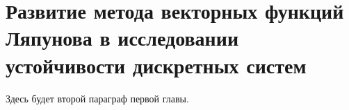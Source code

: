\section{Развитие метода векторных функций Ляпунова в исследовании устойчивости дискретных систем} \label{p12}

Здесь будет второй параграф первой главы.